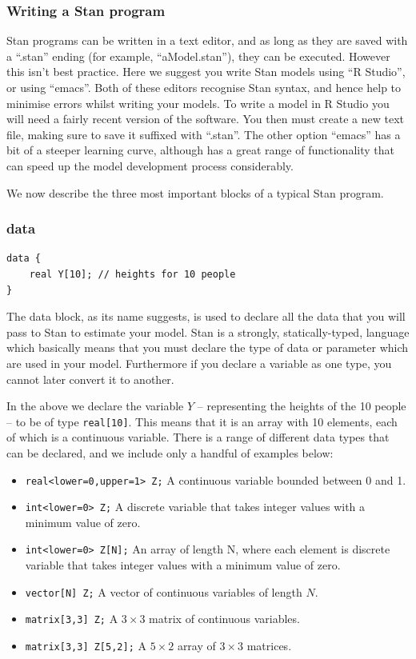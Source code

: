 \documentclass[11pt,fullpage]{book}
\begin{document}
\subsubsection{Writing a Stan program}
Stan programs can be written in a text editor, and as long as they are saved with a ``.stan'' ending (for example, ``aModel.stan''), they can be executed. However this isn't best practice. Here we suggest you write Stan models using ``R Studio'', or using ``emacs''. Both of these editors recognise Stan syntax, and hence help to minimise errors whilst writing your models. To write a model in R Studio you will need a fairly recent version of the software. You then must create a new text file, making sure to save it suffixed with ``.stan''. The other option ``emacs'' has a bit of a steeper learning curve, although has a great range of functionality that can speed up the model development process considerably.

We now describe the three most important blocks of a typical Stan program.

\subsubsection{data}
\begin{verbatim}
data {
    real Y[10]; // heights for 10 people
}
\end{verbatim}

The data block, as its name suggests, is used to declare all the data that you will pass to Stan to estimate your model. Stan is a strongly, statically-typed, language which basically means that you must declare the type of data or parameter which are used in your model. Furthermore if you declare a variable as one type, you cannot later convert it to another. 

In the above we declare the variable $Y$ -- representing the heights of the 10 people -- to be of type \texttt{real[10]}. This means that it is an array with 10 elements, each of which is a continuous variable. There is a range of different data types that can be declared, and we include only a handful of examples below:

\begin{itemize}
\item \texttt{real<lower=0,upper=1> Z;} A continuous variable bounded between 0 and 1.
\item \texttt{int<lower=0> Z;} A discrete variable that takes integer values with a minimum value of zero.
\item \texttt{int<lower=0> Z[N];} An array of length N, where each element is discrete variable that takes integer values with a minimum value of zero.
\item \texttt{vector[N] Z;} A vector of continuous variables of length $N$.
\item \texttt{matrix[3,3] Z;} A $3\times3$ matrix of continuous variables.
\item \texttt{matrix[3,3] Z[5,2];} A $5\times 2$ array of $3\times3$ matrices.
\end{itemize}
\end{document}
